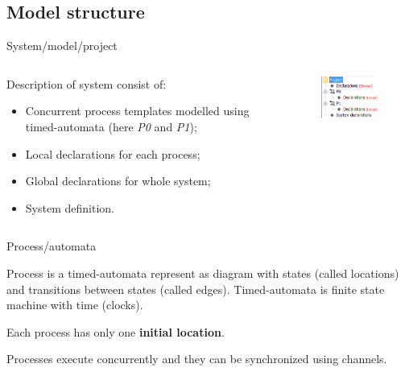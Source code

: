 \documentclass{beamer}
\begin{document}
\subsection{Model structure}
\begin{frame}{System/model/project}
	
	\begin{columns}
		\begin{column}{0.7\textwidth}
			Description of system consist of:	
			\begin{itemize}
				\item Concurrent process templates modelled using timed-automata (here \textit{P0} and \textit{P1});
				\item Local declarations for each process;
				\item Global declarations for whole system;
				\item System definition.
			\end{itemize}
		\end{column}
		
		\begin{column}{0.37\textwidth}
			\begin{figure}[H]
				\includegraphics[scale=1]{img/uppaal_project.png}
			\end{figure}
		\end{column}
	\end{columns}
\end{frame}

\begin{frame}{Process/automata}
	
	Process is a timed-automata represent as diagram with states
	(called locations) and transitions between states (called edges). Timed-automata is finite state machine with time (clocks).\newline

	Each process has only one \textbf{initial location}.\newline
	
	Processes execute concurrently and they can be synchronized using channels.\newline
\end{frame}
\end{document}
